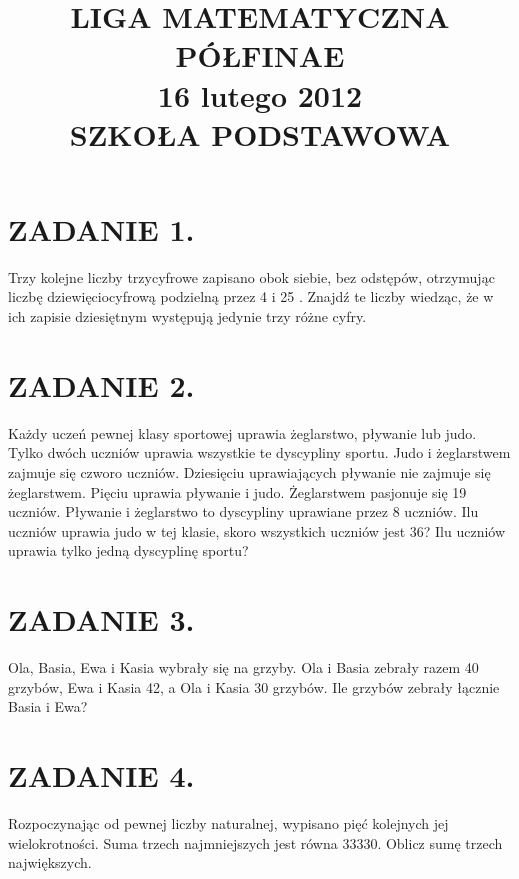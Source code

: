 \documentclass[10pt]{article}
\title{LIGA MATEMATYCZNA \\
 PÓŁFINAE \\
 16 lutego 2012 \\
 SZKOŁA PODSTAWOWA }
\author{}
\date{}
\begin{document}
\maketitle
\section*{ZADANIE 1.}
Trzy kolejne liczby trzycyfrowe zapisano obok siebie, bez odstępów, otrzymując liczbę dziewięciocyfrową podzielną przez 4 i 25 . Znajdź te liczby wiedząc, że w ich zapisie dziesiętnym występują jedynie trzy różne cyfry.

\section*{ZADANIE 2.}
Każdy uczeń pewnej klasy sportowej uprawia żeglarstwo, pływanie lub judo. Tylko dwóch uczniów uprawia wszystkie te dyscypliny sportu. Judo i żeglarstwem zajmuje się czworo uczniów. Dziesięciu uprawiających pływanie nie zajmuje się żeglarstwem. Pięciu uprawia pływanie i judo. Żeglarstwem pasjonuje się 19 uczniów. Pływanie i żeglarstwo to dyscypliny uprawiane przez 8 uczniów. Ilu uczniów uprawia judo w tej klasie, skoro wszystkich uczniów jest 36? Ilu uczniów uprawia tylko jedną dyscyplinę sportu?

\section*{ZADANIE 3.}
Ola, Basia, Ewa i Kasia wybrały się na grzyby. Ola i Basia zebrały razem 40 grzybów, Ewa i Kasia 42, a Ola i Kasia 30 grzybów. Ile grzybów zebrały łącznie Basia i Ewa?

\section*{ZADANIE 4.}
Rozpoczynając od pewnej liczby naturalnej, wypisano pięć kolejnych jej wielokrotności. Suma trzech najmniejszych jest równa 33330. Oblicz sumę trzech największych.
\end{document}
